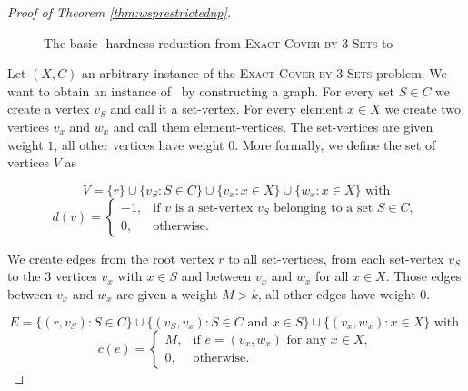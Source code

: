 \begin{proof}[Proof of Theorem \ref{thm:wsprestrictednp}]
\begin{figure}[H]
{
		}%
		\caption{The basic \NP-hardness reduction from \textsc{Exact Cover by $3$-Sets} to \maxWSP}
		\label{fig:x3creduction}
	\end{figure}
	
	Let $(X,C)$ an arbitrary instance of the \textsc{Exact Cover by $3$-Sets} problem. We want to obtain an instance of \maxWSP\ by constructing a graph. For every set $S \in C$ we create a vertex $v_S$ and call it a set-vertex. For every element $x \in X$ we create two vertices $v_x$ and $w_x$ and call them element-vertices. The set-vertices are given weight $1$, all other vertices have weight $0$. More formally, we define the set of vertices $V$ as
	
	$$V = \{r\} \cup \{v_S \colon S \in C \} \cup \{ v_x \colon x \in X \} \cup \{ w_x \colon x \in X \} \text{ with}$$
	$$d(v) =
	\begin{cases}
	-1,  & \text{if } v \text{ is a set-vertex } v_S \text{ belonging to a set } S \in C,\\
	0,  & \text{otherwise}.
	\end{cases}$$
	
	We create edges from the root vertex $r$ to all set-vertices, from each set-vertex $v_S$ to the $3$ vertices $v_x$ with $x \in S$ and between $v_x$ and $w_x$ for all $x \in X$. Those edges between $v_x$ and $w_x$ are given a weight $M > k$, all other edges have weight $0$.
	
	$$E = \{ (r,v_S) \colon S \in C \} \cup \{ (v_S, v_x) \colon S \in C \text{ and } x \in S \} \cup \{ (v_x, w_x) \colon x \in X \} \text{ with }$$
	$$c(e) =
	\begin{cases}
	M,  & \text{if } e = (v_x, w_x) \text{ for any } x \in X,\\
	0,  & \text{otherwise}.
	\end{cases}$$
	

\end{proof}
